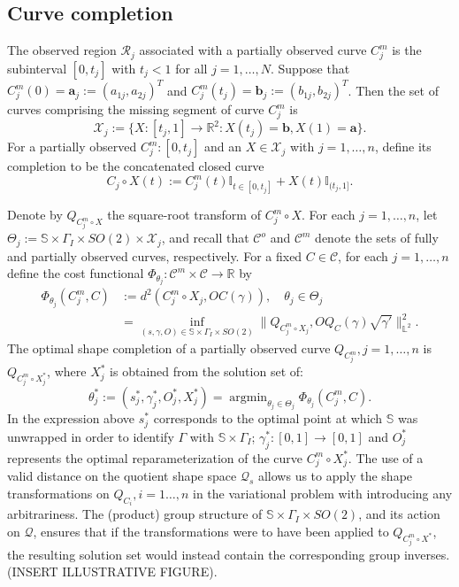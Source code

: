 \documentclass[11pt]{amsart}
\newcommand{\C}{C}
\newcommand{\X}{X}
\newcommand{\Rtwo}{\mathbb{R}^2}
\newcommand{\ltwo}{\mathbb{L}^2}
\newcommand{\uc}{\mathbb{S}}
\DeclareMathOperator*{\argmin}{argmin}
\theoremstyle{definition}
\begin{document}
\subsection{Curve completion}
The observed region $\mathcal{R}_j$ associated with a partially observed curve $\C^m_j$ is the subinterval $[0,t_j]$ with $t_j<1$ for all $j=1,\ldots,N$. Suppose that $\C^m_j(0)=\mathbf{a}_j:=(a_{1j},a_{2j})^T$ and $\C^m_j(t_j)=\mathbf{b}_j:=(b_{1j},b_{2j})^T$. Then the set of curves comprising the missing segment of curve $\C^m_j$ is 
$$\mathcal{X}_j:=\{\X: [t_j,1] \to \Rtwo: \X(t_j)=\mathbf{b}, \X(1)=\mathbf{a}\} .$$
For a partially observed $\C_j^m:[0,t_j]$ and an $X \in \mathcal{X}_j$ with $j=1,\ldots,n$, define its completion to be the concatenated closed curve
\begin{equation*}
C_j \circ X(t):= \C_j^m(t) \mathbb{I}_{t \in [0,t_j]}+\X(t) \mathbb{I}_{(t_j,1]}.
\end{equation*}

Denote by $Q_{\C^m_j \circ X}$ the square-root transform of $\C^m_j \circ X$. For each $j=1,\ldots,n$, let $\Theta_j:=\uc \times \Gamma_I \times SO(2) \times \mathcal{X}_j$, and recall that $\mathcal{C}^o$ and $\mathcal{C}^m$ denote the sets of fully and partially observed curves, respectively. For a fixed $C \in \mathcal{C}$, for each $j=1,\ldots,n$ define the cost functional $\Phi_{\theta_j}:\mathcal{C}^m \times \mathcal{C} \to \mathbb{R}$ by
\begin{align*}
\Phi_{\theta_j}(C_j^m,C)&:=d^2(C_j^m \circ X_j, OC(\gamma)), \quad \theta_j \in \Theta_j\\
&=\inf_{(s,\gamma,O) \in \uc \times \Gamma_I\times SO(2)}\|Q_{C_j^m \circ X_j}, OQ_{C}(\gamma)\sqrt{\gamma'}\|_{\ltwo}^2.
\end{align*}
The optimal shape completion of a partially observed curve $Q_{C_j^m}, j=1,\ldots,n$ is $Q_{C_j^m\circ X_j^*}$, where $X_j^*$ is obtained from the solution set of:
\begin{equation}
\label{opt}
\theta^*_j:=(s_j^*,\gamma_j^*,O_j^*,X_j^*)=\argmin_{\theta_j \in \Theta_j} \Phi_{\theta_j}(C_j^m,C).
\end{equation}
In the expression above $s_j^*$ corresponds to the optimal point at which $\uc$ was unwrapped in order to identify $\Gamma$ with $\uc \times \Gamma_I$; $\gamma_j^*:[0,1] \to [0,1]$ and $O_j^*$ represents the optimal reparameterization of the curve $C^m_j \circ X^*_j$. The use of a valid distance on the quotient shape space $\mathcal{Q}_s$ allows us to apply the shape transformations on $Q_{C_i}, i=1\ldots,n$ in the variational problem with introducing any arbitrariness. The (product) group structure of $\uc \times \Gamma_I\times SO(2)$, and its action on $\mathcal{Q}$, ensures that if the transformations were to have been applied to $Q_{C^m_j \circ X^*}$, the resulting solution set would instead contain the corresponding group inverses. 
(INSERT ILLUSTRATIVE FIGURE). 
\end{document}

